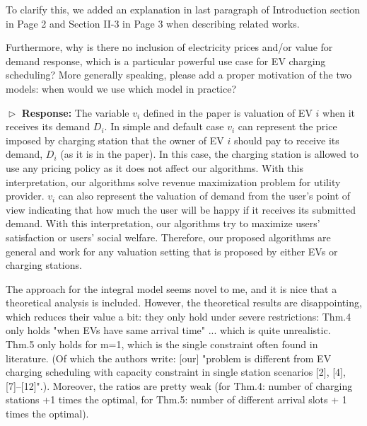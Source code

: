 \documentclass[11pt]{article}
\newcommand{\bt}[1]{{\color{black}#1}}%
\newcommand{\bt}[1]{#1}
\begin{document}
\bt{To clarify this, we added an explanation in last paragraph of Introduction section in Page 2 and Section II-3 in Page 3 when describing related works.   }

\vspace{3mm}
{\color{blue} Furthermore, why is there no inclusion of electricity prices and/or value for demand response, which is a particular powerful use case for EV charging scheduling? More generally speaking, please add a proper motivation of the two models: when would we use which model in practice? }
\vspace{3mm}

$\vartriangleright$ \noindent\textbf{Response:} 
The variable $v_i$ defined in the paper is valuation of EV $i$ when it receives its demand $D_i$. In simple and default case $v_i$ can represent the price imposed by charging station that the owner of EV $i$ should pay to receive its demand, $D_i$ (as it is in the paper). In this case, the charging station is allowed to use any pricing policy as it does not affect our algorithms. With this interpretation, our algorithms solve revenue maximization problem for utility provider. $v_i$ can also represent the valuation of demand from the user's point of view indicating that how much the user will be happy if it receives its submitted demand. With this interpretation, our algorithms try to maximize users' satisfaction or users' social welfare. Therefore, our proposed algorithms are general and work for any valuation setting that is proposed by either EVs or charging stations.
	
\vspace{3mm}
{\color{blue} The approach for the integral model seems novel to me, and it is nice that a theoretical analysis is included. However, the theoretical results are disappointing, which reduces their value a bit: they only hold under severe restrictions: Thm.4 only holds "when EVs have same arrival time" ... which is quite unrealistic. Thm.5 only holds for m=1, which is the single constraint often found in literature. (Of which the authors write: [our] "problem is different from EV charging scheduling with capacity constraint in single station scenarios [2], [4], [7]–[12]".). Moreover, the ratios are pretty weak (for Thm.4: number of charging stations +1 times the optimal, for Thm.5: number of different arrival slots + 1 times the optimal). }
\vspace{3mm}
\end{document}
